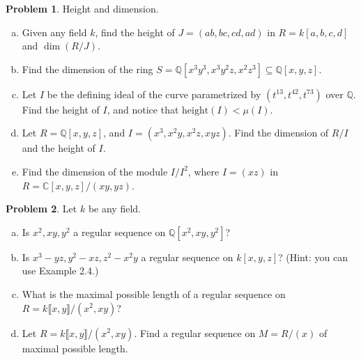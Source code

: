 \documentclass[11pt]{article}
\theoremstyle{definition}
\newtheorem{problem}{Problem}
\begin{document}
\begin{problem}
Height and dimension.
	\begin{enumerate}[a)]
		\item Given any field $k$, find the height of $J = (ab,bc,cd,ad)$ in $R = k[a,b,c,d]$ and $\dim(R/J)$.
		\item Find the dimension of the ring $S = \mathbb{Q}[x^3y^3, x^3y^2z, x^2z^3] \subseteq \mathbb{Q}[x,y,z]$.
		\item Let $I$ be the defining ideal of the curve parametrized by $(t^{13},t^{42},t^{73})$ over $\mathbb{Q}$. Find the height of $I$, and notice that $\textrm{height}(I) < \mu(I)$.
		\item Let $R=\mathbb{Q}[x,y,z]$, and $I=(x^3, x^2y, x^2z, xyz)$. Find the dimension of $R/I$ and the height of $I$.
		\item Find the dimension of the module $I/I^2$, where $I = (xz)$ in $R = \mathbb{C}[x,y,z]/(xy,yz)$.	
	\end{enumerate}
\end{problem}


\begin{problem}
	Let $k$ be any field. 
	\begin{enumerate}[a)]
		\item Is $x^2, xy, y^2$ a regular sequence on $\mathbb{Q}[x^2,xy,y^2]$?
		\item Is $x^3-yz, y^2-xz, z^2-x^2y$ a regular sequence on $k[x,y,z]$? (Hint: you can use Example 2.4.)
		\item What is the maximal possible length of a regular sequence on $R = k \llbracket x,y \rrbracket / (x^2,xy)$?
		\item Let $R = k \llbracket x,y \rrbracket/(x^2,xy)$. Find a regular sequence on $M = R/(x)$ of maximal possible length.
	\end{enumerate}
\end{problem}
\end{document}
